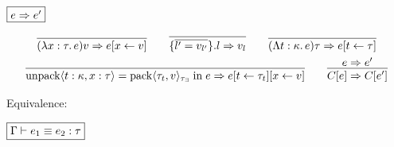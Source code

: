 $\fbox{$e \Rightarrow e'$}$

\begin{gather*}
  \infer{(\lambda x: \tau\ldotp e) v \smalleval e[x \assign v]}{}
  \hspace{2em}
  \infer{\{\overline{l' = v_{l'}}\}.l \smalleval v_l}{}
  \hspace{2em}
  \infer{(\Lambda t: \kappa\ldotp e) \tau \smalleval e[t \assign \tau]}{}
  \\
  \infer{\symunpack\langle t: \kappa, x: \tau\rangle = \sympack\langle \tau_t, v\rangle_{\tau_\exists} \symin e \smalleval e[t \assign \tau_t][x \assign v]}{}
  \hspace{2em}
  \infer{C[e] \smalleval C[e']}{
    e \smalleval e'
  }
\end{gather*}

Equivalence:

$\fbox{$\Gamma \vdash e_1 \equiv e_2: \tau$}$

